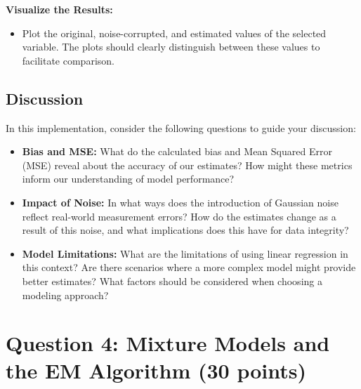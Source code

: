 \documentclass{article}
\begin{document}
\textbf{Visualize the Results:}
\begin{itemize}
    \item Plot the original, noise-corrupted, and estimated values of the selected variable. The plots should clearly distinguish between these values to facilitate comparison.
\end{itemize}

\subsection*{Discussion}
In this implementation, consider the following questions to guide your discussion:

\begin{itemize}
    \item \textbf{Bias and MSE:} What do the calculated bias and Mean Squared Error (MSE) reveal about the accuracy of our estimates? How might these metrics inform our understanding of model performance?

    \item \textbf{Impact of Noise:} In what ways does the introduction of Gaussian noise reflect real-world measurement errors? How do the estimates change as a result of this noise, and what implications does this have for data integrity?

    \item \textbf{Model Limitations:} What are the limitations of using linear regression in this context? Are there scenarios where a more complex model might provide better estimates? What factors should be considered when choosing a modeling approach?
\end{itemize}
 




\section*{Question 4: Mixture Models and the EM Algorithm (30 points)}
\end{document}
